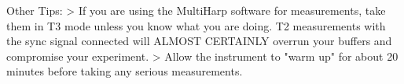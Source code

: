 Other Tips:
    > If you are using the MultiHarp software for measurements, take them in T3 mode unless you know what you are doing. T2 measurements with the sync signal connected will ALMOST CERTAINLY overrun your buffers and compromise your experiment. 
    > Allow the instrument to "warm up" for about 20 minutes before taking any serious measurements. 